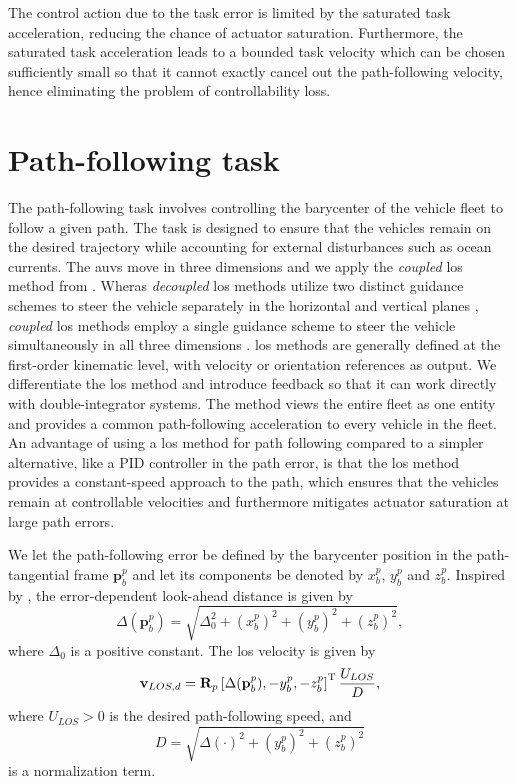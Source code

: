 The control action due to the task error is limited by the saturated task acceleration, reducing the chance of actuator saturation. Furthermore, the saturated task acceleration leads to a bounded task velocity which can be chosen sufficiently small so that it cannot exactly cancel out the path-following velocity, hence eliminating the problem of controllability loss.


\section{Path-following task}\label{sec:path_following}
The path-following task involves controlling the barycenter of the vehicle fleet to follow a given path. The task is designed to ensure that the vehicles remain on the desired trajectory while accounting for external disturbances such as ocean currents. The \glspl{auv} move in three dimensions and we apply the \textit{coupled} \gls{los} method from \cite{matous_singularity-free_2022}. Wheras \textit{decoupled} \gls{los} methods utilize two distinct guidance schemes to steer the vehicle separately in the horizontal and vertical planes \citep{caharija_path_2012}, \textit{coupled} \gls{los} methods employ a single guidance scheme to steer the vehicle simultaneously in all three dimensions \citep{breivik_principles_2005}. \gls{los} methods are generally defined at the first-order kinematic level, with velocity or orientation references as output. We differentiate the \gls{los} method and introduce feedback so that it can work directly with double-integrator systems. The method views the entire fleet as one entity and provides a common path-following acceleration to every vehicle in the fleet. An advantage of using a \gls{los} method for path following compared to a simpler alternative, like a PID controller in the path error, is that the \gls{los} method provides a constant-speed approach to the path, which ensures that the vehicles remain at controllable velocities and furthermore mitigates actuator saturation at large path errors.

We let the path-following error be defined by the barycenter position in the path-tangential frame $\mathbf{p}_b^p$ and let its components be denoted by $x_b^p$, $y_b^p$ and $z_b^p$. Inspired by \cite{belleter_observer_2019}, the error-dependent look-ahead distance is given by
\begin{equation}\label{eq:error-dependent-lookahead}
    \Delta(\mathbf{p}_b^p) = \sqrt{\Delta_0^2 + (x_b^p)^2 + (y_b^p)^2 + (z_b^p)^2},
\end{equation}
where $\Delta_0$ is a positive constant. The \gls{los} velocity is given by
\begin{equation}\label{eq:desired_LOS}
    \mathbf{v}_{LOS, d} = \mathbf{R}_p \left[ \Delta(\mathbf{p}_b^p), -y_b^p, -z_b^p \right]^{\rm T}\frac{U_{LOS}}{D},
\end{equation}
where $U_{LOS} > 0$ is the desired path-following speed, and
\begin{equation}
    D = \sqrt{\Delta(\cdot)^2 + (y_b^p)^2 + (z_b^p)^2}
\end{equation}
is a normalization term.


